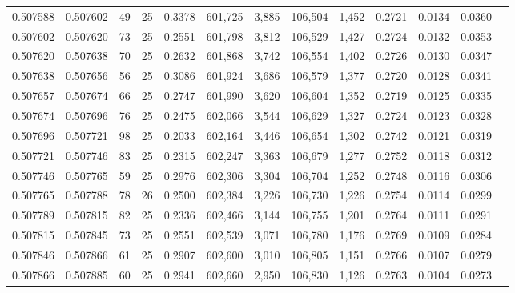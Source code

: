 \begin{tabular}{rrrrrrrrrrrrr}
0.507588 & 0.507602 &  49 &  25 &                                     0.3378 & 601,725 &   3,885 & 106,504 &   1,452 & 0.2721 & 0.0134 & 0.0360 \\
0.507602 & 0.507620 &  73 &  25 &                                     0.2551 & 601,798 &   3,812 & 106,529 &   1,427 & 0.2724 & 0.0132 & 0.0353 \\
0.507620 & 0.507638 &  70 &  25 &                                     0.2632 & 601,868 &   3,742 & 106,554 &   1,402 & 0.2726 & 0.0130 & 0.0347 \\
0.507638 & 0.507656 &  56 &  25 &                                     0.3086 & 601,924 &   3,686 & 106,579 &   1,377 & 0.2720 & 0.0128 & 0.0341 \\
0.507657 & 0.507674 &  66 &  25 &                                     0.2747 & 601,990 &   3,620 & 106,604 &   1,352 & 0.2719 & 0.0125 & 0.0335 \\
0.507674 & 0.507696 &  76 &  25 &                                     0.2475 & 602,066 &   3,544 & 106,629 &   1,327 & 0.2724 & 0.0123 & 0.0328 \\
0.507696 & 0.507721 &  98 &  25 &                                     0.2033 & 602,164 &   3,446 & 106,654 &   1,302 & 0.2742 & 0.0121 & 0.0319 \\
0.507721 & 0.507746 &  83 &  25 &                                     0.2315 & 602,247 &   3,363 & 106,679 &   1,277 & 0.2752 & 0.0118 & 0.0312 \\
0.507746 & 0.507765 &  59 &  25 &                                     0.2976 & 602,306 &   3,304 & 106,704 &   1,252 & 0.2748 & 0.0116 & 0.0306 \\
0.507765 & 0.507788 &  78 &  26 &                                     0.2500 & 602,384 &   3,226 & 106,730 &   1,226 & 0.2754 & 0.0114 & 0.0299 \\
0.507789 & 0.507815 &  82 &  25 &                                     0.2336 & 602,466 &   3,144 & 106,755 &   1,201 & 0.2764 & 0.0111 & 0.0291 \\
0.507815 & 0.507845 &  73 &  25 &                                     0.2551 & 602,539 &   3,071 & 106,780 &   1,176 & 0.2769 & 0.0109 & 0.0284 \\
0.507846 & 0.507866 &  61 &  25 &                                     0.2907 & 602,600 &   3,010 & 106,805 &   1,151 & 0.2766 & 0.0107 & 0.0279 \\
0.507866 & 0.507885 &  60 &  25 &                                     0.2941 & 602,660 &   2,950 & 106,830 &   1,126 & 0.2763 & 0.0104 & 0.0273 \\

\end{tabular}
